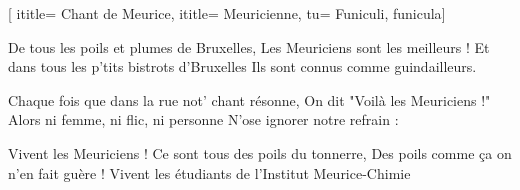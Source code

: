  [
ititle= {Chant de Meurice},
ititle= {Meuricienne},
tu= {Funiculi, funicula}]

\beginverse
De tous les poils et plumes de Bruxelles,
Les Meuriciens sont les meilleurs !
Et dans tous les p’tits bistrots d’Bruxelles
Ils sont connus comme guindailleurs.
\endverse

\beginverse
Chaque fois que dans la rue not' chant résonne,
On dit "Voilà les Meuriciens !"
Alors ni femme, ni flic, ni personne
N'ose ignorer notre refrain :
\endverse

\beginverse
{} {Vivent les Meuriciens !}
Ce sont tous des poils du tonnerre,
Des poils comme ça on n'en fait guère !
Vivent les étudiants de l'Institut Meurice-Chimie
\endverse

\endsong
